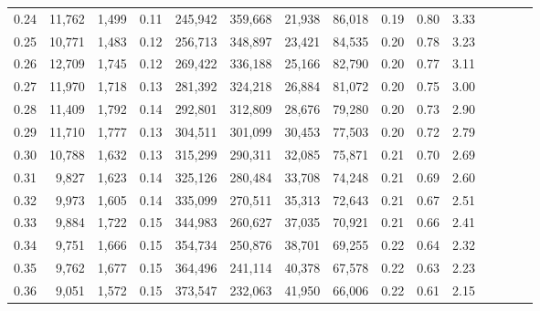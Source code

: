 \begin{tabular}{rrrcrrrrrrrrrrr}
0.24 &  11,762 &  1,499 &                                       0.11 &  245,942 &  359,668 &   21,938 &   86,018 &  0.19 &  0.80 &                         3.33 \\
0.25 &  10,771 &  1,483 &                                       0.12 &  256,713 &  348,897 &   23,421 &   84,535 &  0.20 &  0.78 &                         3.23 \\
0.26 &  12,709 &  1,745 &                                       0.12 &  269,422 &  336,188 &   25,166 &   82,790 &  0.20 &  0.77 &                         3.11 \\
0.27 &  11,970 &  1,718 &                                       0.13 &  281,392 &  324,218 &   26,884 &   81,072 &  0.20 &  0.75 &                         3.00 \\
0.28 &  11,409 &  1,792 &                                       0.14 &  292,801 &  312,809 &   28,676 &   79,280 &  0.20 &  0.73 &                         2.90 \\
0.29 &  11,710 &  1,777 &                                       0.13 &  304,511 &  301,099 &   30,453 &   77,503 &  0.20 &  0.72 &                         2.79 \\
0.30 &  10,788 &  1,632 &                                       0.13 &  315,299 &  290,311 &   32,085 &   75,871 &  0.21 &  0.70 &                         2.69 \\
0.31 &   9,827 &  1,623 &                                       0.14 &  325,126 &  280,484 &   33,708 &   74,248 &  0.21 &  0.69 &                         2.60 \\
0.32 &   9,973 &  1,605 &                                       0.14 &  335,099 &  270,511 &   35,313 &   72,643 &  0.21 &  0.67 &                         2.51 \\
0.33 &   9,884 &  1,722 &                                       0.15 &  344,983 &  260,627 &   37,035 &   70,921 &  0.21 &  0.66 &                         2.41 \\
0.34 &   9,751 &  1,666 &                                       0.15 &  354,734 &  250,876 &   38,701 &   69,255 &  0.22 &  0.64 &                         2.32 \\
0.35 &   9,762 &  1,677 &                                       0.15 &  364,496 &  241,114 &   40,378 &   67,578 &  0.22 &  0.63 &                         2.23 \\
0.36 &   9,051 &  1,572 &                                       0.15 &  373,547 &  232,063 &   41,950 &   66,006 &  0.22 &  0.61 &                         2.15 \\

\end{tabular}
